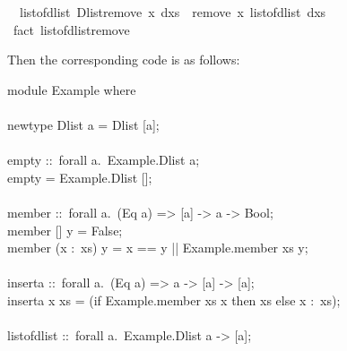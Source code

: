 \begin{isabellebody}
\ \ {\isachardoublequoteopen}list{\isacharunderscore}of{\isacharunderscore}dlist\ {\isacharparenleft}Dlist{\isachardot}remove\ x\ dxs{\isacharparenright}\ {\isacharequal}\ remove{}\ x\ {\isacharparenleft}list{\isacharunderscore}of{\isacharunderscore}dlist\ dxs{\isacharparenright}{\isachardoublequoteclose}\isanewline
\ \ \isamarkupfalse%
\ {\isacharparenleft}fact\ list{\isacharunderscore}of{\isacharunderscore}dlist{\isacharunderscore}remove{\isacharparenright}%
\endisatagquote
{\isafoldquote}%
%
\isadelimquote
%
\endisadelimquote
%
\begin{isamarkuptext}%
\noindent Then the corresponding code is as follows:%
\end{isamarkuptext}%
\isamarkuptrue%
%
\isadelimquote
%
\endisadelimquote
%
\isatagquote
%
\begin{isamarkuptext}%
\isatypewriter%
\noindent%
\hspace*{0pt}module Example where {}\\
\hspace*{0pt}\\
\hspace*{0pt}newtype Dlist a = Dlist [a];\\
\hspace*{0pt}\\
\hspace*{0pt}empty ::~forall a.~Example.Dlist a;\\
\hspace*{0pt}empty = Example.Dlist [];\\
\hspace*{0pt}\\
\hspace*{0pt}member ::~forall a.~(Eq a) => [a] -> a -> Bool;\\
\hspace*{0pt}member [] y = False;\\
\hspace*{0pt}member (x :~xs) y = x == y || Example.member xs y;\\
\hspace*{0pt}\\
\hspace*{0pt}inserta ::~forall a.~(Eq a) => a -> [a] -> [a];\\
\hspace*{0pt}inserta x xs = (if Example.member xs x then xs else x :~xs);\\
\hspace*{0pt}\\
\hspace*{0pt}list{}of{}dlist ::~forall a.~Example.Dlist a -> [a];\\

\end{isamarkuptext}
\end{isabellebody}
